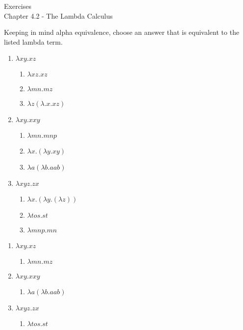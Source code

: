 \documentclass{article}
\newcommand\ExTitle{Chapter 4.2 - The Lambda Calculus}
\newcommand\fullExTitle{Exercises \\ \ExTitle }
\begin{document}
\begin{Huge}
	\begin{center}
	\fullExTitle
	\end{center}
\end{Huge}
\begin{Exercise}
Keeping in mind  alpha equivalence,  choose an answer that is equivalent to the listed lambda term.
\begin{enumerate}
\item 
$\lambda xy.xz$
\begin{enumerate}
  \item 
  $\lambda xz.xz$
  \item
  $\lambda mn.mz$
  \item
  $\lambda z (\lambda.x.xz)$
  \end{enumerate}
  \item
  $\lambda xy.xxy$
  \begin{enumerate}
  \item 
  $\lambda mn.mnp$
   \item 
  $\lambda x.(\lambda y .xy)$
   \item 
  $\lambda a(\lambda b. aab)$
  \end{enumerate}
  \item
   $\lambda xyz. zx$
 \begin{enumerate}
  \item 
     $\lambda x.(\lambda y.(\lambda  z))$
   \item 
     $\lambda tos.st$
       \item 
     $\lambda mnp.mn$
  \end{enumerate}
   \end{enumerate}
 
 \end{Exercise}
\begin{Answer}
  \begin{enumerate}
    \item 
    $\lambda xy.xz$
   \begin{enumerate}[start=2]
      \item 
      $\lambda mn.mz$
   
    \end{enumerate}
      \item
      $\lambda xy.xxy$
      \begin{enumerate}[start=3]
       \item 
      $\lambda a(\lambda b. aab)$
      \end{enumerate}
      \item
       $\lambda xyz. zx$
       \begin{enumerate}[start=2]
       \item 
         $\lambda tos.st$
      \end{enumerate}
       \end{enumerate}
      \end{Answer}
\end{document}
